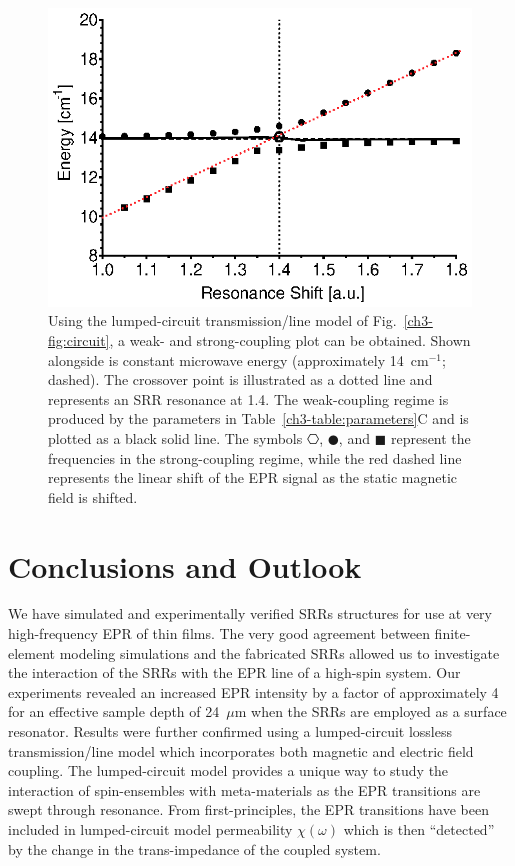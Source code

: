 \begin{figure}[htp]\centering
  \includegraphics{Kapitel/Ch3-Images/08-RadiationDampening.eps}%
  \caption[Calculated weak- and strong-coupling regime using the analytical model.]{Using the lumped-circuit transmission\-/line model of Fig.~\ref{ch3-fig:circuit}, a weak- and strong-coupling plot can be obtained. Shown alongside is constant microwave energy (approximately 14~cm$^{-1}$; dashed). The crossover point is illustrated as a dotted line and represents an SRR resonance at 1.4. The weak-coupling regime is produced by the parameters in Table~\ref{ch3-table:parameters}C and is plotted as a black solid line. The symbols $\hexagon$, $\CIRCLE$, and $\blacksquare$ represent the frequencies in the strong-coupling regime, while the red dashed line represents the linear shift of the EPR signal as the static magnetic field is shifted.}\label{ch3-fig:strong-weak}
\end{figure}

\section{Conclusions and Outlook}
We have simulated and experimentally verified SRRs structures for use at very high-frequency EPR of thin films. The very good agreement between finite-element modeling simulations and the fabricated SRRs allowed us to investigate the interaction of the SRRs with the EPR line of a high-spin system. Our experiments revealed an increased EPR intensity by a factor of approximately 4 for an effective sample depth of 24~$\mu$m when the SRRs are employed as a surface resonator. Results were further confirmed using a lumped-circuit lossless transmission\-/line model which incorporates both magnetic and electric field coupling. The lumped-circuit model provides a unique way to study the interaction of spin-ensembles with meta-materials as the EPR transitions are swept through resonance. From first-principles, the EPR transitions have been included in lumped-circuit model permeability $\chi(\omega)$ which is then ``detected'' by the change in the trans-impedance of the coupled system.

